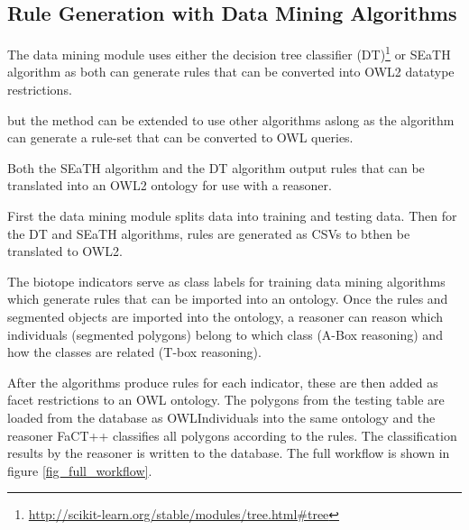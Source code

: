 \documentclass[authoryear, review,12pt,number]{elsarticle}
\begin{document}
\subsection{Rule Generation with Data Mining Algorithms}
\label{subsec_rulegen_data_mining}
The data mining module uses either the decision tree classifier 
(DT)\footnote{\url{http://scikit-learn.org/stable/modules/tree.html\#tree}} 
\citep{scikit-learn} or SEaTH algorithm \citep{Nussbaum2006} as both can 
generate rules that can be converted into OWL2 datatype restrictions.

but the method can be 
extended to use other algorithms aslong as the algorithm can generate a rule-set 
that can be converted to OWL
queries. 

Both the SEaTH algorithm and the DT algorithm output rules that can be 
translated into an OWL2 ontology for use with a reasoner. 

First the data mining module splits data into training and testing data. 
Then for the DT and SEaTH algorithms, rules are generated as CSVs to bthen be 
translated to OWL2.


The biotope indicators serve as class labels for training data mining
algorithms which generate rules that can be imported into an ontology. Once the
rules and segmented objects are imported into the ontology, a reasoner can
reason which individuals (segmented polygons) belong to which class (A-Box 
reasoning) and how the classes are related (T-box reasoning).

After the algorithms produce rules for 
each indicator, these are then added as facet restrictions to an OWL ontology. 
The polygons from the testing table are loaded from the database as
OWLIndividuals into the same ontology and the reasoner FaCT++ classifies all 
polygons according to the rules. The classification results by the reasoner 
is written to the database. The full workflow is shown in figure 
\ref{fig_full_workflow}.
\end{document}
